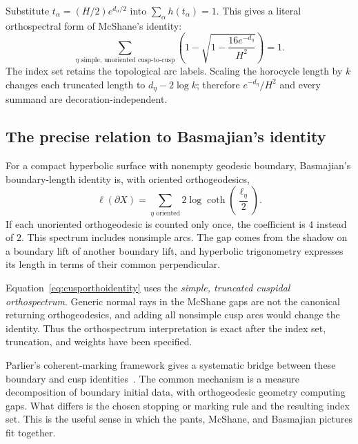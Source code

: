 Substitute $t_\alpha=(H/2)e^{d_\alpha/2}$ into
$\sum_\alpha h(t_\alpha)=1$. This gives a literal orthospectral form of
McShane's identity:
\begin{equation}
 \boxed{
 \sum_{\eta\text{ simple, unoriented cusp-to-cusp}}
 \left(1-\sqrt{1-\frac{16e^{-d_\eta}}{H^2}}\right)=1.}
 \label{eq:cusporthoidentity}
\end{equation}
The index set retains the topological arc labels. Scaling the horocycle
length by $k$ changes each truncated length to $d_\eta-2\log k$;
therefore $e^{-d_\eta}/H^2$ and every summand are decoration-independent.

\subsection{The precise relation to Basmajian's identity}

For a compact hyperbolic surface with nonempty geodesic boundary,
Basmajian's boundary-length identity is, with oriented orthogeodesics,
\begin{equation}
 \ell(\partial X)=
 \sum_{\eta\text{ oriented}}2\log\coth\left(\frac{\ell_\eta}{2}\right).
 \label{eq:basmajian}
\end{equation}
If each unoriented orthogeodesic is counted only once, the coefficient is
$4$ instead of $2$. This spectrum includes nonsimple arcs. The gap comes
from the shadow on a boundary lift of another boundary lift, and
hyperbolic trigonometry expresses its length in terms of their common
perpendicular.

Equation~\eqref{eq:cusporthoidentity} uses the \emph{simple, truncated
cuspidal orthospectrum}. Generic normal rays in the McShane gaps are not
the canonical returning orthogeodesics, and adding all nonsimple cusp arcs
would change the identity. Thus the orthospectrum interpretation is exact
after the index set, truncation, and weights have been specified.

Parlier's coherent-marking framework gives a systematic bridge between
these boundary and cusp identities~\cite{Parlier}. The common mechanism
is a measure decomposition of boundary initial data, with orthogeodesic
geometry computing gaps. What differs is the chosen stopping or marking
rule and the resulting index set. This is the useful sense in which the
pants, McShane, and Basmajian pictures fit together.

